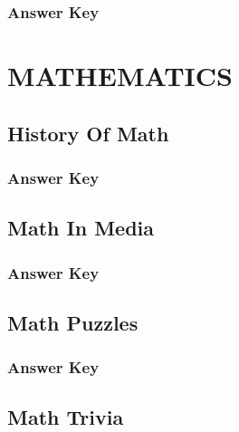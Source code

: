 \documentclass[12pt,a4paper]{book}
\begin{document}
\subsection*{Answer Key}



\chapter{MATHEMATICS}

\section{History Of Math}



\subsection*{Answer Key}



\section{Math In Media}



\subsection*{Answer Key}



\section{Math Puzzles}



\subsection*{Answer Key}



\section{Math Trivia}
\end{document}

